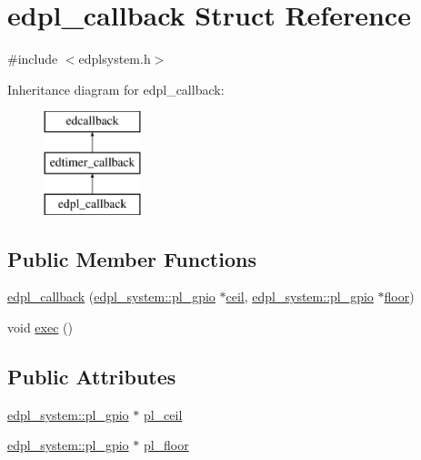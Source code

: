 \hypertarget{structedpl__callback}{\section{edpl\-\_\-callback Struct Reference}
\label{structedpl__callback}
}


{\ttfamily \#include $<$edplsystem.\-h$>$}

Inheritance diagram for edpl\-\_\-callback\-:\begin{figure}[H]
\begin{center}
\leavevmode
\includegraphics[height=3.000000cm]{structedpl__callback}
\end{center}
\end{figure}
\subsection*{Public Member Functions}
\begin{DoxyCompactItemize}
\item 
\hyperlink{structedpl__callback_ad921d4f126d38a6e2e7769a507c75caf}{edpl\-\_\-callback} (\hyperlink{structedpl__system_1_1pl__gpio}{edpl\-\_\-system\-::pl\-\_\-gpio} $\ast$\hyperlink{nsvec4_8h_a83b4b86a11bb43587ae7fa2d3d1f3856}{ceil}, \hyperlink{structedpl__system_1_1pl__gpio}{edpl\-\_\-system\-::pl\-\_\-gpio} $\ast$\hyperlink{nsvec4_8h_a0409361f2277fca322689ffb014595c0}{floor})
\item 
void \hyperlink{structedpl__callback_a23c8aacf97d5a080af1f7d84439122c8}{exec} ()
\end{DoxyCompactItemize}
\subsection*{Public Attributes}
\begin{DoxyCompactItemize}
\item 
\hyperlink{structedpl__system_1_1pl__gpio}{edpl\-\_\-system\-::pl\-\_\-gpio} $\ast$ \hyperlink{structedpl__callback_acab7f06faf5fb508993d61e47f07da75}{pl\-\_\-ceil}
\item 
\hyperlink{structedpl__system_1_1pl__gpio}{edpl\-\_\-system\-::pl\-\_\-gpio} $\ast$ \hyperlink{structedpl__callback_a6f63343abef0d00077beadfb3a05aab6}{pl\-\_\-floor}
\end{DoxyCompactItemize}


